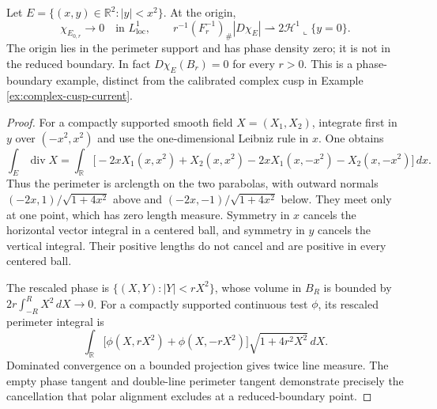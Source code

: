 \begin{example}\label{ex:quadratic-cusp-perimeter}
Let $E=\{(x,y)\in\mathbb R^2:|y|<x^2\}$. At the origin,
\[
 \chi_{E_{0,r}}\to0\quad\text{in }L^1_{\mathrm{loc}},\qquad
 r^{-1}(F_r^{-1})_\#|D\chi_E|
 \rightharpoonup2\mathcal H^1\llcorner\{y=0\}.
\]
The origin lies in the perimeter support and has phase density zero; it is not in the reduced boundary. In fact $D\chi_E(B_r)=0$ for every $r>0$. This is a phase-boundary example, distinct from the calibrated complex cusp in Example \ref{ex:complex-cusp-current}.
\end{example}
\begin{proof}
For a compactly supported smooth field $X=(X_1,X_2)$, integrate first in $y$ over $(-x^2,x^2)$ and use the one-dimensional Leibniz rule in $x$. One obtains
\[
 \int_E\operatorname{div}X
 =\int_{\mathbb R}\bigl[-2xX_1(x,x^2)+X_2(x,x^2)
                       -2xX_1(x,-x^2)-X_2(x,-x^2)\bigr]\,dx.
\]
Thus the perimeter is arclength on the two parabolas, with outward normals $(-2x,1)/\sqrt{1+4x^2}$ above and $(-2x,-1)/\sqrt{1+4x^2}$ below. They meet only at one point, which has zero length measure. Symmetry in $x$ cancels the horizontal vector integral in a centered ball, and symmetry in $y$ cancels the vertical integral. Their positive lengths do not cancel and are positive in every centered ball.

The rescaled phase is $\{(X,Y):|Y|<rX^2\}$, whose volume in $B_R$ is bounded by $2r\int_{-R}^R X^2\,dX\to0$. For a compactly supported continuous test $\phi$, its rescaled perimeter integral is
\[
 \int_{\mathbb R}\bigl[\phi(X,rX^2)+\phi(X,-rX^2)\bigr]
                       \sqrt{1+4r^2X^2}\,dX.
\]
Dominated convergence on a bounded projection gives twice line measure. The empty phase tangent and double-line perimeter tangent demonstrate precisely the cancellation that polar alignment excludes at a reduced-boundary point.
\end{proof}

